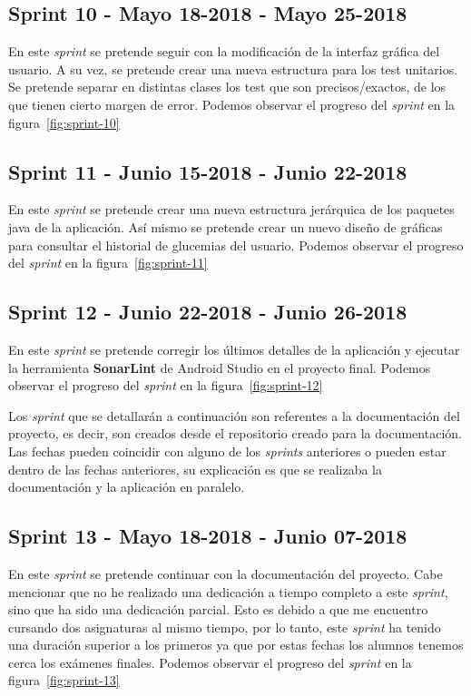 \subsection{Sprint 10 - Mayo 18-2018 - Mayo 25-2018}
En este \textit{sprint} se pretende seguir con la modificación de la interfaz gráfica del usuario. 
A su vez, se pretende crear una nueva estructura para los test unitarios. Se pretende separar en distintas clases los test que son precisos/exactos, de los que tienen cierto margen de error. 
Podemos observar el progreso del \textit{sprint} en la figura~\ref{fig:sprint-10}
\subsection{Sprint 11 - Junio 15-2018 - Junio 22-2018}
En este \textit{sprint} se pretende crear una nueva estructura jerárquica de los paquetes java de la aplicación. Así mismo se pretende crear un nuevo diseño de gráficas para consultar el historial de glucemias del usuario.
Podemos observar el progreso del \textit{sprint} en la figura~\ref{fig:sprint-11}
\subsection{Sprint 12 - Junio 22-2018 - Junio 26-2018}
En este \textit{sprint} se pretende corregir los últimos detalles de la aplicación y ejecutar la herramienta \textbf{SonarLint} de Android Studio en el proyecto final.
Podemos observar el progreso del \textit{sprint} en la figura~\ref{fig:sprint-12}


Los \textit{sprint} que se detallarán a continuación son referentes a la documentación del proyecto, es decir, son creados desde el repositorio creado para la documentación. Las fechas pueden coincidir con alguno de los \textit{sprints} anteriores o pueden estar dentro de las fechas anteriores, su explicación es que se realizaba la documentación y la aplicación en paralelo.
\subsection{Sprint 13 - Mayo 18-2018 - Junio 07-2018}
En este \textit{sprint} se pretende continuar con la documentación del proyecto.
Cabe mencionar que no he realizado una dedicación a tiempo completo a este \textit{sprint}, sino que ha sido una dedicación parcial. Esto es debido a que me encuentro cursando dos asignaturas al mismo tiempo, por lo tanto, este \textit{sprint} ha tenido una duración superior a los primeros ya que por estas fechas los alumnos tenemos cerca los exámenes finales.
Podemos observar el progreso del \textit{sprint} en la figura~\ref{fig:sprint-13}
